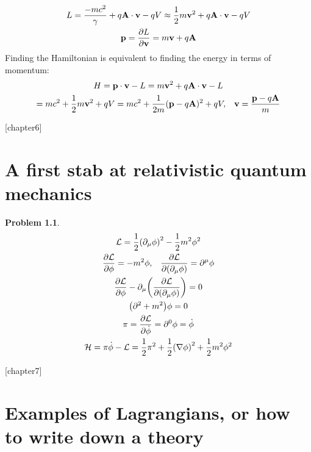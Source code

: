 \documentclass{report}
\theoremstyle{definition}
\begin{document}
\begin{chapter5}
	\begin{gather*}
		L = \frac{-mc^2}{\gamma} + q{\bf A}\cdot{\bf v} - qV \approx \frac{1}{2}m{\bf v}^2 + q{\bf A}\cdot{\bf v} - qV \\
		{\bf p} = \pdv{L}{\bf v} = m{\bf v} + q{\bf A}
	\end{gather*}
	Finding the Hamiltonian is equivalent to finding the energy in terms of momentum:
	\begin{gather*}
		H = {\bf p\cdot v} - L = m{\bf v}^2 + q{\bf A \cdot v} - L \\ 
		= mc^2 + \frac{1}{2}m{\bf v}^2 + qV = mc^2 + \frac{1}{2m}({\bf p} - q{\bf A})^2 + qV, \;\;\;{\bf v} = \frac{{\bf p} - q{\bf A}}{m}
	\end{gather*}
\end{chapter5}

\newtheorem{chapter6}{Problem}
[chapter6]
\chapter{A first stab at relativistic quantum mechanics}

\begin{chapter6}
	\begin{gather*}
		\mathcal{L} = \frac{1}{2}\pqty{\partial_{\mu}\phi}^2 - \frac{1}{2}m^2\phi^2 \\
		\pdv{\mathcal{L}}{\phi} = -m^2\phi, \;\;\; \pdv{\mathcal{L}}{\pqty{\partial_{\mu}\phi}} = \partial^{\mu}\phi \\
		\pdv{\mathcal{L}}{\phi}-\partial_{\mu}\pqty{\pdv{\mathcal{L}}{\pqty{\partial_{\mu}\phi}}} = 0 \\
		\pqty{\partial^2 + m^2}\phi = 0 \\
		\pi = \pdv{\mathcal{L}}{\dot{\phi}} = \partial^0 \phi = \dot{\phi} \\
		\mathcal{H} = \pi\dot{\phi} - \mathcal{L} = \frac{1}{2}\pi^2 + \frac{1}{2}\pqty{\nabla{\phi}}^2 + \frac{1}{2}m^2\phi^2 \\
	\end{gather*}
\end{chapter6}

\newtheorem{chapter7}{Problem}
[chapter7]
\chapter{Examples of Lagrangians, or how to write down a theory}
\end{document}
